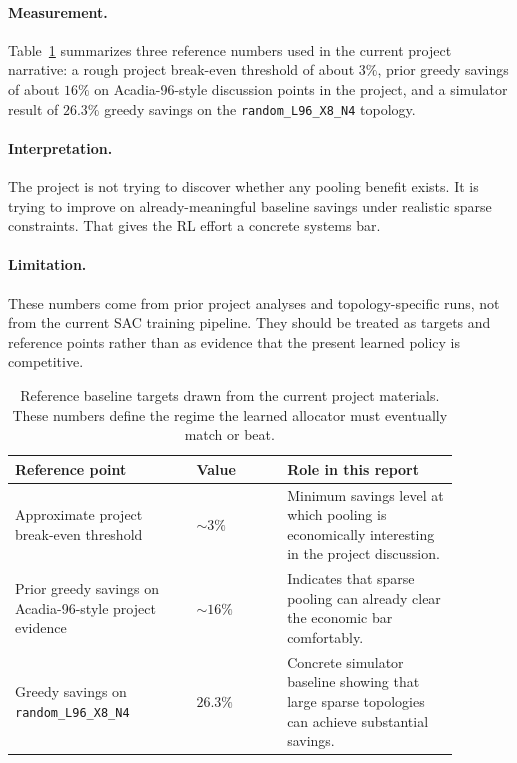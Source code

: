 \documentclass[11pt]{article}
\theoremstyle{definition}
\begin{document}
\paragraph{Measurement.}
Table~\ref{tab:baseline_targets} summarizes three reference numbers used in the
current project narrative: a rough project break-even threshold of about $3\%$,
prior greedy savings of about $16\%$ on Acadia-96-style discussion points in the
project, and a simulator result of $26.3\%$ greedy savings on the
\texttt{random\_L96\_X8\_N4} topology.

\paragraph{Interpretation.}
The project is not trying to discover whether any pooling benefit exists. It is
trying to improve on already-meaningful baseline savings under realistic sparse
constraints. That gives the RL effort a concrete systems bar.

\paragraph{Limitation.}
These numbers come from prior project analyses and topology-specific runs, not
from the current SAC training pipeline. They should be treated as targets and
reference points rather than as evidence that the present learned policy is
competitive.

\begin{table}[H]
\centering
\small
\renewcommand{\arraystretch}{1.2}
\begin{tabular}{p{0.36\linewidth}p{0.18\linewidth}p{0.34\linewidth}}
\toprule
\textbf{Reference point} & \textbf{Value} & \textbf{Role in this report} \\
\midrule
Approximate project break-even threshold & $\sim 3\%$ & Minimum savings level at which pooling is economically interesting in the project discussion. \\
Prior greedy savings on Acadia-96-style project evidence & $\sim 16\%$ & Indicates that sparse pooling can already clear the economic bar comfortably. \\
Greedy savings on \texttt{random\_L96\_X8\_N4} & $26.3\%$ & Concrete simulator baseline showing that large sparse topologies can achieve substantial savings. \\
\bottomrule
\end{tabular}
\caption{Reference baseline targets drawn from the current project materials.
These numbers define the regime the learned allocator must eventually match or
beat.}
\label{tab:baseline_targets}
\end{table}
\end{document}

